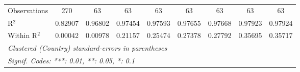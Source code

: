 \begin{table}[htbp]
\begin{tabular}{lcccccccc}
      Observations                                                             & 270      & 63       & 63              & 63              & 63              & 63              & 63              & 63\\  
      R$^2$                                                                    & 0.82907  & 0.96802  & 0.97454         & 0.97593         & 0.97655         & 0.97668         & 0.97923         & 0.97924\\  
      Within R$^2$                                                             & 0.00042  & 0.00978  & 0.21157         & 0.25474         & 0.27378         & 0.27792         & 0.35695         & 0.35717\\  
      \midrule \midrule
      \multicolumn{9}{l}{\emph{Clustered (Country) standard-errors in parentheses}}\\
      \multicolumn{9}{l}{\emph{Signif. Codes: ***: 0.01, **: 0.05, *: 0.1}}\\
   \end{tabular}
\end{table}


